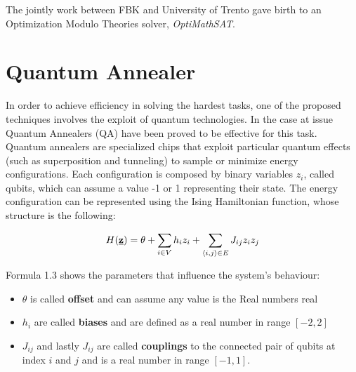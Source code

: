 The jointly work between FBK and University of Trento gave birth to an Optimization Modulo Theories solver, \textit{OptiMathSAT}.

\section{Quantum Annealer}
\label{sec:quantum}

In order to achieve efficiency in solving the hardest tasks, one of the proposed techniques involves the exploit of quantum technologies. In the case at issue Quantum Annealers (QA) have been proved to be effective for this task. \\
Quantum annealers are specialized chips that exploit particular quantum effects (such as superposition and tunneling) to sample or minimize energy configurations. Each configuration is composed by binary variables $z_i$, called qubits, which can assume a value -1 or 1 representing their state. The energy configuration can be represented using the Ising Hamiltonian function, whose structure is the following:

\begin{equation}
    H(\textbf{\underline{z}}) = \theta + \sum_{i \in V} h_iz_i + \sum_{\langle i,j\rangle \in E} J_{ij} z_iz_j
\end{equation}

Formula 1.3 shows the parameters that influence the system's behaviour: 

\begin{itemize}
    \item $\theta$ is called \textbf{offset} and can assume any value is the Real numbers real
    \item $h_i$ are called \textbf{biases} and are defined as a real number in range $[-2,2]$
    \item $J_{ij}$ and lastly $J_{ij}$ are called \textbf{couplings} to the connected pair of qubits at index $i$ and $j$ and is a real number in range $[-1,1]$.
\end{itemize}

